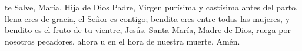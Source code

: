 te Salve, María, Hija de Dios Padre, Virgen purísima y castísima antes del parto, llena eres de gracia, el Señor es contigo; 
bendita eres entre todas las mujeres, y bendito es el fruto de tu vientre, Jesús. Santa María, Madre de Dios, ruega por nosotros pecadores,
ahora u en el hora de nuestra muerte. Amén.